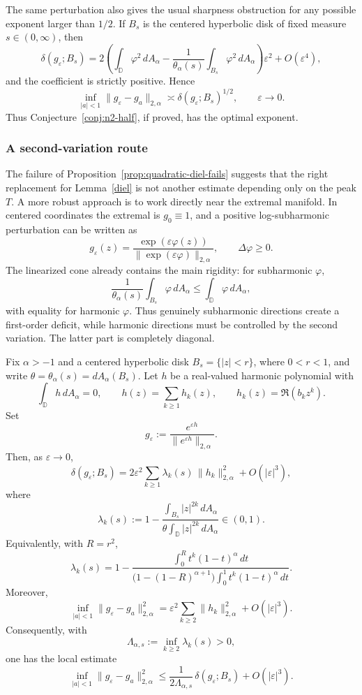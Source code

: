 \documentclass[a4paper,10pt]{amsart}
\newcommand{\D}{\mathbb{D}}
\begin{document}
The same perturbation also gives the usual sharpness obstruction for any
possible exponent larger than $1/2$. If $B_s$ is the centered hyperbolic disk
of fixed measure $s\in(0,\infty)$, then
\[
\delta(g_\varepsilon;B_s)
=
2\left(
\int_\D\varphi^2\,dA_\alpha
-
\frac{1}{\theta_\alpha(s)}\int_{B_s}\varphi^2\,dA_\alpha
\right)\varepsilon^2
+O(\varepsilon^4),
\]
and the coefficient is strictly positive. Hence
\[
\inf_{|a|<1}\|g_\varepsilon-g_a\|_{2,\alpha}
\asymp
\delta(g_\varepsilon;B_s)^{1/2},
\qquad \varepsilon\to0.
\]
Thus Conjecture~\ref{conj:n2-half}, if proved, has the optimal exponent.

\subsubsection*{A second-variation route}

The failure of Proposition~\ref{prop:quadratic-diel-fails} suggests that the
right replacement for Lemma~\ref{diel} is not another estimate depending only
on the peak $T$. A more robust approach is to work directly near the extremal
manifold. In centered coordinates the extremal is $g_0\equiv1$, and a positive
log-subharmonic perturbation can be written as
\[
g_\varepsilon(z)=
\frac{\exp(\varepsilon\varphi(z))}
{\|\exp(\varepsilon\varphi)\|_{2,\alpha}},
\qquad \Delta\varphi\ge0.
\]
The linearized cone already contains the main rigidity: for subharmonic
$\varphi$,
\[
\frac1{\theta_\alpha(s)}\int_{B_s}\varphi\,dA_\alpha
\le
\int_\D\varphi\,dA_\alpha,
\]
with equality for harmonic $\varphi$. Thus genuinely subharmonic directions
create a first-order deficit, while harmonic directions must be controlled by
the second variation. The latter part is completely diagonal.

\begin{numprop}\label{prop:harmonic-second-variation}
Fix $\alpha>-1$ and a centered hyperbolic disk $B_s=\{|z|<r\}$, where
$0<r<1$, and write $\theta=\theta_\alpha(s)=dA_\alpha(B_s)$.
Let $h$ be a real-valued harmonic polynomial with
\[
\int_\D h\,dA_\alpha=0,
\qquad
h(z)=\sum_{k\ge1} h_k(z),
\qquad
h_k(z)=\Re(b_k z^k).
\]
Set
\[
g_\varepsilon:=
\frac{e^{\varepsilon h}}{\|e^{\varepsilon h}\|_{2,\alpha}}.
\]
Then, as $\varepsilon\to0$,
\[
\delta(g_\varepsilon;B_s)
=
2\varepsilon^2
\sum_{k\ge1}\lambda_k(s)\,\|h_k\|_{2,\alpha}^2
+O(|\varepsilon|^3),
\]
where
\[
\lambda_k(s)
:=
1-
\frac{\displaystyle\int_{B_s}|z|^{2k}\,dA_\alpha}
{\displaystyle\theta\int_\D |z|^{2k}\,dA_\alpha}
\in(0,1).
\]
Equivalently, with $R=r^2$,
\[
\lambda_k(s)
=
1-
\frac{\displaystyle\int_0^R t^k(1-t)^\alpha\,dt}
{\displaystyle\bigl(1-(1-R)^{\alpha+1}\bigr)
\int_0^1 t^k(1-t)^\alpha\,dt}.
\]
Moreover,
\[
\inf_{|a|<1}\|g_\varepsilon-g_a\|_{2,\alpha}^2
=
\varepsilon^2\sum_{k\ge2}\|h_k\|_{2,\alpha}^2
+O(|\varepsilon|^3).
\]
Consequently, with
\[
\Lambda_{\alpha,s}:=\inf_{k\ge2}\lambda_k(s)>0,
\]
one has the local estimate
\[
\inf_{|a|<1}\|g_\varepsilon-g_a\|_{2,\alpha}^2
\le
\frac{1}{2\Lambda_{\alpha,s}}\,
\delta(g_\varepsilon;B_s)
+O(|\varepsilon|^3).
\]
\end{numprop}
\end{document}
